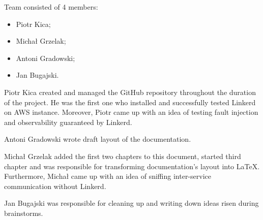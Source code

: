 \documentclass{article}
\begin{document}
Team consisted of 4 members:

\begin{itemize}
		\item Piotr Kica;
		\item Michał Grzelak;
		\item Antoni Gradowski;
		\item Jan Bugajski.
\end{itemize}

Piotr Kica created and managed the GitHub repository throughout the duration of
the project. He was the first one who installed and successfully tested Linkerd
on AWS instance. Moreover, Piotr came up with an idea of testing fault
injection and observability guaranteed by Linkerd.

Antoni Gradowski wrote draft layout of the documentation.

Michał Grzelak added the first two chapters to this document, started third
chapter and was responsible for transforming documentation's layout into
\LaTeX. Furthermore, Michał came up with an idea of sniffing inter-service
communication without Linkerd.

Jan Bugajski was responsible for cleaning up and writing down ideas risen
during brainstorms.


\end{document}
